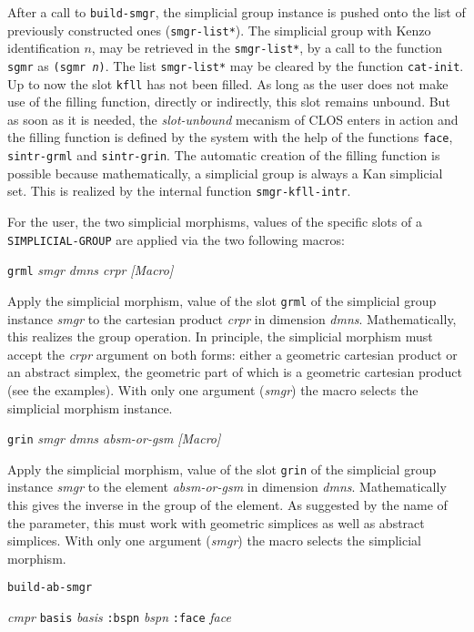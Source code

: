 \vskip 0.30cm
After a call to {\tt build-smgr}, the simplicial group instance
is pushed onto the list of previously constructed  ones ({\tt *smgr-list*}).
The simplicial group with Kenzo identification $n$, may be retrieved in the {\tt *smgr-list*},
by a call to the function {\tt sgmr}
as {\tt (sgmr {\em n})}. The list {\tt *smgr-list*} may be cleared by the function {\tt cat-init}.
\vskip 0.30cm
Up to now the slot {\tt kfll} has not been filled. As long as the user does not make use of the filling
function, directly or indirectly, this slot remains unbound. But as soon as it is needed, the {\em slot-unbound}
mecanism of CLOS enters in action and the filling function is defined by the system with
the help of the functions {\tt face}, {\tt sintr-grml} and {\tt sintr-grin}. The automatic creation
of the filling function is possible because mathematically, a simplicial group is always a Kan simplicial set.
This is realized by the internal function {\tt smgr-kfll-intr}.\par
For the user, the two simplicial morphisms,
values of the specific slots  of a {\tt SIMPLICIAL-GROUP} are applied via the two following macros:
\vskip 0.30cm
{\parindent=0mm
{\leftskip=5mm
{\tt grml} {\em smgr dmns crpr} \hfill {\em [Macro]} \par}
{\leftskip=15mm
Apply the simplicial morphism, value of the slot {\tt grml} of the simplicial group instance {\em smgr}
to the cartesian product {\em crpr} in dimension {\em dmns}. Mathematically, this realizes the
group operation. In principle, the simplicial morphism must
accept the {\em crpr} argument on both forms: either a geometric cartesian product or an abstract simplex,
the geometric part of which is a geometric cartesian pro\-duct (see the examples). With only one argument
({\em smgr}) the macro selects the simplicial morphism instance. \par}
{\leftskip=5mm
{\tt grin} {\em smgr dmns absm-or-gsm} \hfill {\em [Macro]} \par}
{\leftskip=15mm
Apply the simplicial morphism, value of the slot {\tt grin} of the simplicial group instance {\em smgr}
to the element {\em absm-or-gsm} in dimension {\em dmns}. Mathematically this gives the inverse
in the group of the e\-le\-ment. As suggested by the name of the parameter, this must work with geometric
simplices as well as abstract simplices. With only one argument
({\em smgr}) the macro selects the simplicial morphism. \par}
}
\newpage
{\tt build-ab-smgr}\par
\hspace {0.60cm}{\tt :cmpr} {\em cmpr} {\tt basis} {\em basis} {\tt :bspn} {\em bspn} {\tt :face} {\em face}
